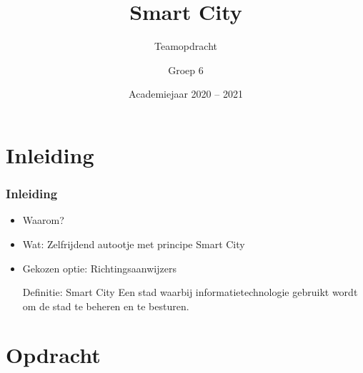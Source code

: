 \documentclass
   [kulak] %
   {kulakbeamer}
\title[Smart City]{Smart City}
\subtitle{Teamopdracht}
\author[Groep 6]{Groep 6}%
\institute[Kulak]{KU Leuven Kulak}
\date{Academiejaar 2020 -- 2021}
\begin{document}
\begin{titleframe}
\titlepage
\end{titleframe}




\section{Inleiding}

\begin{frame}
\frametitle{Inleiding}
\begin{itemize}
	
	\item Waarom?
	\item Wat: Zelfrijdend autootje met principe Smart City
	\item Gekozen optie: Richtingsaanwijzers

	\begin{block}{Definitie: Smart City}
		Een stad waarbij informatietechnologie gebruikt wordt om de stad te beheren en te besturen. \cite{SmartCity}
	\end{block}
\end{itemize}
\end{frame}

\begin{outlineframe}[Overzicht]
	\tableofcontents
\end{outlineframe}

\section[Opdracht]{Opdracht}%
\end{document}
